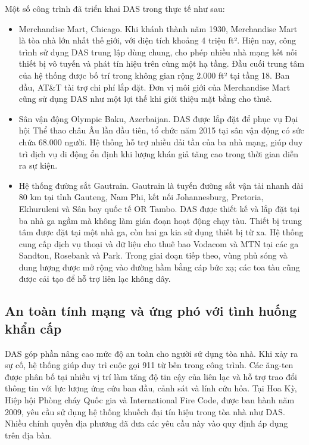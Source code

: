 \documentclass{thesis}
\begin{document}
Một số công trình đã triển khai DAS trong thực tế như sau:

\begin{itemize}
  \item Merchandise Mart, Chicago. Khi khánh thành năm 1930,
    Merchandise Mart là tòa nhà lớn nhất thế giới, với diện tích
    khoảng 4 triệu ft². Hiện nay, công trình sử dụng DAS trung lập
    dùng chung, cho phép nhiều nhà mạng kết nối thiết bị vô tuyến và
    phát tín hiệu trên cùng một hạ tầng. Đầu cuối trung tâm của hệ
    thống được bố trí trong không gian rộng 2.000 ft² tại tầng 18.
    Ban đầu, AT\&T tài trợ chi phí lắp đặt. Đơn vị môi giới của
    Merchandise Mart cũng sử dụng DAS như một lợi thế khi giới thiệu
    mặt bằng cho thuê.
  \item Sân vận động Olympic Baku, Azerbaijan. DAS được lắp đặt để phục
    vụ Đại hội Thể thao châu Âu lần đầu tiên, tổ chức năm 2015 tại sân
    vận động có sức chứa 68.000 người. Hệ thống hỗ trợ nhiều dải tần của
    ba nhà mạng, giúp duy trì dịch vụ di động ổn định khi lượng khán giả
    tăng cao trong thời gian diễn ra sự kiện.
  \item Hệ thống đường sắt Gautrain. Gautrain là tuyến đường sắt vận tải
    nhanh dài 80 km tại tỉnh Gauteng, Nam Phi, kết nối Johannesburg,
    Pretoria, Ekhuruleni và Sân bay quốc tế OR Tambo. DAS được thiết kế
    và lắp đặt tại ba nhà ga ngầm mà không làm gián đoạn hoạt động chạy
    tàu. Thiết bị trung tâm được đặt tại một nhà ga, còn hai ga kia sử
    dụng thiết bị từ xa. Hệ thống cung cấp dịch vụ thoại và dữ liệu cho
    thuê bao Vodacom và MTN tại các ga Sandton, Rosebank và Park. Trong
    giai đoạn tiếp theo, vùng phủ sóng và dung lượng được mở rộng vào
    đường hầm bằng cáp bức xạ; các toa tàu cũng được cải tạo để hỗ trợ
    liên lạc không dây.
\end{itemize}

\subsection{An toàn tính mạng và ứng phó với tình huống khẩn cấp}

DAS góp phần nâng cao mức độ an toàn cho người sử dụng tòa nhà. Khi
xảy ra sự cố, hệ thống giúp duy trì cuộc gọi 911 từ bên trong công
trình. Các ăng-ten được phân bố tại nhiều vị trí làm tăng độ tin cậy
của liên lạc và hỗ trợ trao đổi thông tin với lực lượng ứng cứu ban
đầu, cảnh sát và lính cứu hỏa. Tại Hoa Kỳ, Hiệp hội Phòng cháy Quốc
gia và International Fire Code, được ban hành năm 2009, yêu cầu sử
dụng hệ thống khuếch đại tín hiệu trong tòa nhà như DAS. Nhiều chính
quyền địa phương đã đưa các yêu cầu này vào quy định áp dụng trên địa bàn.
\end{document}
